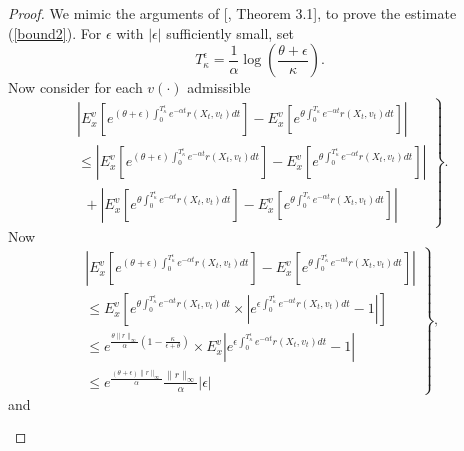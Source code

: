 \documentclass[11pt]{amsart}
\numberwithin{equation}{section}
\begin{document}
\begin{proof}
We mimic the arguments of [\cite{anup_borkar_suresh}, Theorem 3.1], to prove the estimate (\ref{bound2}).
For $\epsilon$ with 
$|\epsilon|$ sufficiently small, set
$$
T^{\epsilon}_{\kappa} = \frac{1}{\alpha} \log\left(\frac{\theta + \epsilon}{\kappa}\right).
$$ 
Now consider for each $v(\cdot)$ admissible
\begin{equation}\label{inter}
 \left.
\begin{array}{lll}
 \displaystyle{ \left| E^v_x\left[ e^{ (\theta+\epsilon) \int_{0}^{T^{\epsilon}_{\kappa}}  e^{-\alpha t} r(X_t, v_t) dt }
\right] - E^v_x\left[ e^{ \theta \int_{0}^{T_{\kappa}}  e^{-\alpha t} r(X_t, v_t) dt }\right] \right| } \\
\leq \displaystyle{ \left| E^v_x\left[ e^{ (\theta+\epsilon) \int_{0}^{T^{\epsilon}_{\kappa} } e^{-\alpha t} r(X_t, v_t) dt }\right]
 - E^v_x\left[ e^{ \theta \int_{0}^{T^{\epsilon}_{\kappa}}  e^{-\alpha t} r(X_t, v_t) dt }\right] \right| } \\
\ \ + \displaystyle{ \left| E^v_x\left[ e^{ \theta \int_{0}^{T^{\epsilon}_{\kappa} } e^{-\alpha t} r(X_t, v_t) dt }\right] -
E^v_x\left[ e^{ \theta \int_{0}^{T_{\kappa}}  e^{-\alpha t} r(X_t, v_t) dt } \right]\right| }
\end{array}
\right\}.
\end{equation}
Now 
\begin{equation}\label{inter1}
 \left.
\begin{array}{lll}
 \displaystyle{ \left| E^v_x\left[ e^{ (\theta+\epsilon) \int_{0}^{T^{\epsilon}_{\kappa} } e^{-\alpha t} r(X_t, v_t) dt }\right]
 - E^v_x\left[ e^{ \theta \int_{0}^{T^{\epsilon}_{\kappa}}  e^{-\alpha t} r(X_t, v_t) dt }\right] \right| } \\
\leq \displaystyle{  E^v_x\left[ e^{ \theta \int_{0}^{T^{\epsilon}_{\kappa} } e^{-\alpha t} r(X_t, v_t) dt } 
\times \left| e^{ \epsilon \int_{0}^{T^{\epsilon}_{\kappa}}  e^{-\alpha t} r(X_t, v_t) dt } -1 \right| \right] } \\
\leq \displaystyle{   e^{ \frac{\theta \|r\|_{\infty} } {\alpha} \left(1-\frac{\kappa} {\epsilon +\theta}\right)  } 
\times E^v_x \left| e^{ \epsilon \int_{0}^{T^{\epsilon}_{\kappa}}  e^{-\alpha t} r(X_t, v_t) dt } -1 \right|  } \\
\leq e^{\frac{(\theta+\epsilon)\|r\|_{\infty}}{\alpha}} \frac{\|r\|_{\infty}}{\alpha} |\epsilon|
\end{array}
\right\},
\end{equation}
and 
\begin{eqnarray*}
 \left.
\begin{array}{lll}

\end{array}
\end{eqnarray*}
\end{proof}
\end{document}
